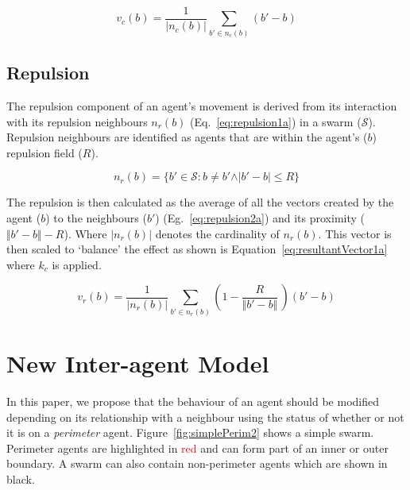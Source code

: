 \documentclass[12pt,a4paper]{IEEEtran}
\newcommand{\magn}[1]{\Vert{#1}\Vert}
\newcommand{\card}[1]{\vert{#1}\vert}
\newcommand{\vbb}[2]{#2-#1}
\newcommand{\kc}{\mathit{k_{c}}}
\newcommand{\rb}{\mathit{R}}
\begin{document}
\begin{equation}\label{eq:cohesion2}
v_c(b) = \frac{1}{\card{n_c(b)}} \sum_{b' \in n_c(b)}(\vbb{b}{b'})
\end{equation}

\subsection{Repulsion}\label{repulsion:neighbours}
The repulsion component of an agent's movement is derived from its interaction with its repulsion neighbours $n_r(b)$ (Eq.~\ref{eq:repulsion1a}) in a swarm ($\mathcal{S}$). Repulsion neighbours are identified as agents that are within the agent's ($b$) repulsion field ($\rb$).

\begin{equation}\label{eq:repulsion1a}
n_r(b) = \{b' \in \mathcal{S} : b \neq b' \land \card{\vbb{b}{b'}} \leq \rb\}
\end{equation}

The repulsion is then calculated as the average of all the vectors created by the agent ($b$) to the neighbours ($b'$) (Eg.~\ref{eq:repulsion2a}) and its proximity ($\magn{\vbb{b}{b'}} - \rb$). Where $\card{n_r(b)}$ denotes the cardinality of $n_r(b)$. This vector is then scaled to `balance' the effect as shown is Equation~\ref{eq:resultantVector1a} where $\kc$ is applied.

\begin{equation}\label{eq:repulsion2a}
v_r(b) = \frac{1}{\card{n_r(b)}}\sum_{b' \in n_r(b)} \left(1 - \frac{R}{\magn{\vbb{b}{b'}}} \, \right)\left(\vbb{b}{b'}\right)
\end{equation}

\section{New Inter-agent Model}
In this paper, we propose that the behaviour of an agent should be modified depending on its relationship with a neighbour using the status of whether or not it is on a \emph{perimeter} agent. Figure~\ref{fig:simplePerim2} shows a simple swarm. Perimeter agents are highlighted in \textcolor{red}{red} and can form part of an inner or outer boundary. A swarm can also contain non-perimeter agents which are shown in black.
\end{document}
